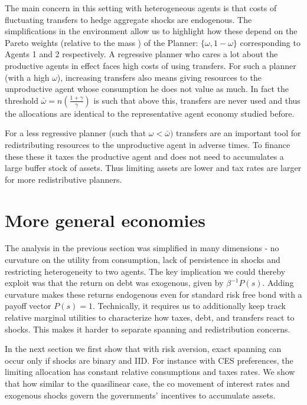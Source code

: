 \documentclass[11.5pt,twoside]{article}
\begin{document}
The main concern in this setting with heterogeneous agents  is that costs of fluctuating transfers to hedge aggregate shocks are endogenous. The simplifications in the environment allow us to highlight how these depend on the Pareto weights (relative to the mass ) of the Planner: $\{\omega,1-\omega\}$ corresponding to Agents 1 and 2 respectively. A regressive planner who cares a lot about the productive agents in effect faces high costs of using transfers. For such a planner (with a high $\omega$), increasing transfers also means giving resources to the unproductive agent whose consumption he does not value as much. In fact the threshold $\bar{\omega}=n\left(\frac{1+\gamma}{\gamma}\right)$ is such that above this, transfers are never used and thus the allocations are identical to the representative agent economy studied before. 

For a less regressive planner (such that $\omega<\bar{\omega})$ transfers are an important tool for redistributing resources to the unproductive agent in adverse times. To finance these these it taxes the productive agent and does not need to accumulates a large buffer stock of assets. Thus limiting assets are lower and tax rates are larger  for more redistributive planners.


\section{More general economies}
\label{Sec: more general economies}
The analysis in the previous section was simplified in many dimensions - no curvature on the utility from consumption, lack of persistence in shocks and restricting heterogeneity to two agents. The key implication we could thereby exploit was that the return on debt was exogenous, given by $\beta^{-1}P(s)$. Adding curvature makes these returns endogenous even for standard risk free bond with a payoff vector $P(s)=1$. Technically, it requires us to additionally keep track relative marginal utilities to characterize how taxes, debt, and transfers react to shocks. This makes it harder to separate spanning and redistribution concerns. 

In the next section we first show that with risk aversion, exact spanning can occur only if shocks are binary and IID. For instance with CES preferences, the limiting allocation has constant relative consumptions and taxes rates. We show that how similar to the quasilinear case, the co movement of interest rates and exogenous shocks govern the governments' incentives to accumulate assets. 
\end{document}

